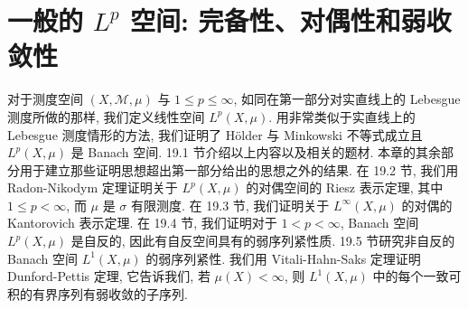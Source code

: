 \documentclass[../main.tex]{subfiles}
\begin{document}
\chapter{一般的 $L^{p}$ 空间: 完备性、对偶性和弱收敛性}\label{chapter:ch19-lp-spaces}

对于测度空间 $(X,\mathcal{M},\mu)$ 与 $1\leqslant p\leqslant\infty$, 如同在第一部分对实直线上的 Lebesgue 测度所做的那样, 我们定义线性空间 $L^{p}(X,\mu)$. 用非常类似于实直线上的 Lebesgue 测度情形的方法, 我们证明了 H\"older 与 Minkowski 不等式成立且 $L^{p}(X,\mu)$ 是 Banach 空间. 19.1 节介绍以上内容以及相关的题材. 本章的其余部分用于建立那些证明思想超出第一部分给出的思想之外的结果. 在 19.2 节, 我们用 Radon-Nikodym 定理证明关于 $L^{p}(X,\mu)$ 的对偶空间的 Riesz 表示定理, 其中 $1\leqslant p<\infty$, 而 $\mu$ 是 $\sigma$ 有限测度. 在 19.3 节, 我们证明关于 $L^{\infty}(X,\mu)$ 的对偶的 Kantorovich 表示定理. 在 19.4 节, 我们证明对于 $1<p<\infty$, Banach 空间 $L^{p}(X,\mu)$ 是自反的, 因此有自反空间具有的弱序列紧性质. 19.5 节研究非自反的 Banach 空间 $L^{1}(X,\mu)$ 的弱序列紧性. 我们用 Vitali-Hahn-Saks 定理证明 Dunford-Pettis 定理, 它告诉我们, 若 $\mu(X)<\infty$, 则 $L^{1}(X,\mu)$ 中的每个一致可积的有界序列有弱收敛的子序列.










\end{document}
